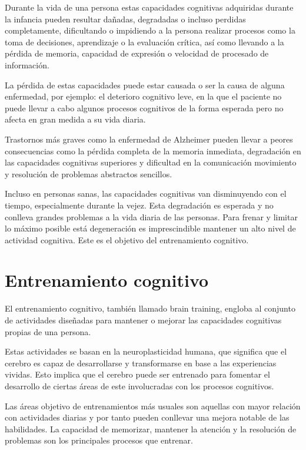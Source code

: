 Durante la vida de una persona estas capacidades cognitivas adquiridas durante la infancia pueden resultar dañadas, degradadas o incluso perdidas completamente, dificultando o impidiendo a la persona realizar procesos como la toma de decisiones, aprendizaje o la evaluación crítica, así como llevando a la pérdida de memoria, capacidad de expresión o velocidad de procesado de información. \cite{EA_cog_deterioro}

La pérdida de estas capacidades puede estar causada o ser la causa de alguna enfermedad, por ejemplo: el deterioro cognitivo leve, en la que el paciente no puede llevar a cabo algunos procesos cognitivos de la forma esperada pero no afecta en gran medida a su vida diaria.

Trastornos más graves como la enfermedad de Alzheimer pueden llevar a peores consecuencias como la pérdida completa de la memoria inmediata, degradación en las capacidades cognitivas superiores y dificultad en la comunicación movimiento y resolución de problemas abstractos sencillos. \cite{EA_cog_alzheimer}

Incluso en personas sanas, las capacidades cognitivas van disminuyendo con el tiempo, especialmente durante la vejez. Esta degradación es esperada y no conlleva grandes problemas a la vida diaria de las personas. Para frenar y limitar lo máximo posible está degeneración es imprescindible mantener un alto nivel de actividad cognitiva. Este es el objetivo del entrenamiento cognitivo.




\section{Entrenamiento cognitivo}
\label{sec:estadoArteEficaciaEntrenamientos}

El entrenamiento cognitivo, también llamado brain training, engloba al conjunto de actividades diseñadas para mantener o mejorar las capacidades cognitivas propias de una persona.

Estas actividades se basan en la neuroplasticidad humana, que significa que el cerebro es capaz de desarrollarse y transformarse en base a las experiencias vividas. Esto implica que el cerebro puede ser entrenado para fomentar el desarrollo de ciertas áreas de este involucradas con los procesos cognitivos. \cite{EA_ent_plasticidad}

Las áreas objetivo de entrenamientos más usuales son aquellas con mayor relación con actividades diarias y por tanto pueden conllevar una mejora notable de las habilidades. La capacidad de memorizar, mantener la atención y la resolución de problemas son los principales procesos que entrenar.

